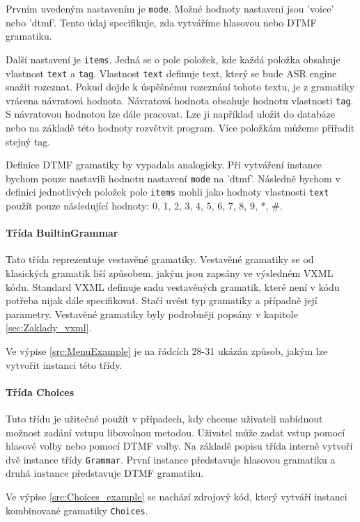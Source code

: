 \documentclass[ing,male,java,dept460]{diploma}						%
\begin{document}
Prvním uvedeným nastavením je \texttt{mode}. Možné hodnoty nastavení jsou 'voice' nebo 'dtmf'. Tento údaj specifikuje, zda vytváříme hlasovou nebo DTMF gramatiku.

Další nastavení je \texttt{items}. Jedná se o pole položek, kde každá položka obsahuje vlastnost \texttt{text} a \texttt{tag}. Vlastnost \texttt{text} definuje text, který se bude ASR engine snažit rozeznat. Pokud dojde k úspěšnému rozeznání tohoto textu, je z gramatiky vrácena návratová hodnota. Návratová hodnota obsahuje hodnotu vlastnosti \texttt{tag}. S návratovou hodnotou lze dále pracovat. Lze ji například uložit do databáze nebo na základě této hodnoty rozvětvit program. Více položkám můžeme přiřadit stejný tag.

Definice DTMF gramatiky by vypadala analogicky. Při vytváření instance bychom pouze nastavili hodnotu nastavení \texttt{mode} na 'dtmf'. Následně bychom v definici jednotlivých položek pole \texttt{items} mohli jako hodnoty vlastnosti \texttt{text} použít pouze následující hodnoty: 0, 1, 2, 3, 4, 5, 6, 7, 8, 9, *, \#.

\paragraph{Třída BuiltinGrammar}
\label{sec:BuiltinGrammar}
Tato třída reprezentuje vestavěné gramatiky. Vestavěné gramatiky se od klasických gramatik liší způsobem, jakým jsou zapsány ve výsledném VXML kódu. Standard VXML definuje sadu vestavěných gramatik, které není v kódu potřeba nijak dále specifikovat. Stačí uvést typ gramatiky a případně její parametry. Vestavěné gramatiky byly podrobněji popsány v kapitole \ref{sec:Zaklady_vxml}.

Ve výpise \ref{src:MenuExample} je na řádcích 28-31 ukázán způsob, jakým lze vytvořit instanci této třídy.

\paragraph{Třída Choices}
\label{sec:Choices}
Tuto třídu je užitečné použít v případech, kdy chceme uživateli nabídnout možnost zadání vstupu libovolnou metodou. Uživatel může zadat vstup pomocí hlasové volby nebo pomocí DTMF volby. Na základě popisu třída interně vytvoří dvě instance třídy \texttt{Grammar}. První instance představuje hlasovou gramatiku a druhá instance představuje DTMF gramatiku.

Ve výpise \ref{src:Choices_example} se nachází zdrojový kód, který vytváří instanci kombinované gramatiky \texttt{Choices}.
\end{document}
